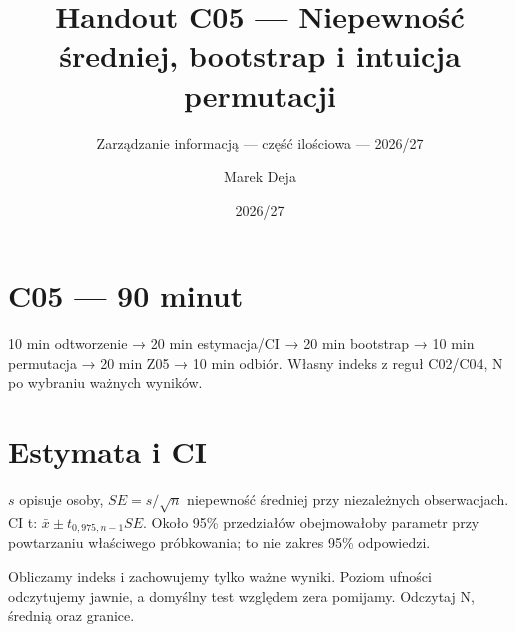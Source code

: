 \documentclass[
  polish,
  11pt,
  a4paper,
]{article}
\title{Handout C05 --- Niepewność średniej, bootstrap i intuicja
permutacji}
\subtitle{Zarządzanie informacją --- część ilościowa --- 2026/27}
\author{Marek Deja}
\date{2026/27}
\newenvironment{Shaded}{\begin{snugshade}}{\end{snugshade}}
\newcommand{\AttributeTok}[1]{\textcolor[rgb]{0.13,0.29,0.53}{#1}}
\newcommand{\DecValTok}[1]{\textcolor[rgb]{0.00,0.00,0.81}{#1}}
\newcommand{\FunctionTok}[1]{\textcolor[rgb]{0.13,0.29,0.53}{\textbf{#1}}}
\newcommand{\NormalTok}[1]{#1}
\newcommand{\OtherTok}[1]{\textcolor[rgb]{0.56,0.35,0.01}{#1}}
\newcommand{\SpecialCharTok}[1]{\textcolor[rgb]{0.81,0.36,0.00}{\textbf{#1}}}
\newcommand{\StringTok}[1]{\textcolor[rgb]{0.31,0.60,0.02}{#1}}
\begin{document}
\maketitle

\section{C05 --- 90 minut}\label{c05-90-minut}

10 min odtworzenie → 20 min estymacja/CI → 20 min bootstrap → 10 min
permutacja → 20 min Z05 → 10 min odbiór. Własny indeks z reguł C02/C04,
N po wybraniu ważnych wyników.

\section{Estymata i CI}\label{estymata-i-ci}

\(s\) opisuje osoby, \(SE=s/\sqrt{n}\) niepewność średniej przy
niezależnych obserwacjach. CI t: \(\bar{x}\pm t_{0{,}975,n-1}SE\). Około
95\% przedziałów obejmowałoby parametr przy powtarzaniu właściwego
próbkowania; to nie zakres 95\% odpowiedzi.

Obliczamy indeks i zachowujemy tylko ważne wyniki. Poziom ufności
odczytujemy jawnie, a domyślny test względem zera pomijamy. Odczytaj N,
średnią oraz granice.

\begin{Shaded}
\end{Shaded}
\end{document}

